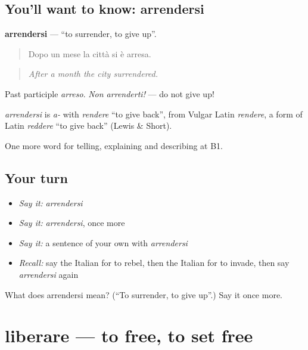 \subsection*{You'll want to know: arrendersi}
\textbf{arrendersi} — \textquotedblleft{}to surrender, to give up\textquotedblright{}.

\begin{quote}
Dopo un mese la città si è arresa.
\end{quote}

\begin{quote}
\emph{After a month the city surrendered.}
\end{quote}

Past participle \emph{arreso}. \emph{Non arrenderti!} — do not give up!

\begin{cousinweb}
\emph{arrendersi} is \emph{a-} with \emph{rendere} \textquotedblleft{}to give back\textquotedblright{}, from Vulgar Latin \emph{rendere}, a form of Latin \emph{reddere} \textquotedblleft{}to give back\textquotedblright{} (Lewis \& Short).
\end{cousinweb}

\begin{grammarlens}[title={What you've built}]
One more word for telling, explaining and describing at B1.
\end{grammarlens}

\subsection*{Your turn}
\begin{itemize}
\raggedright
  \item \emph{Say it:} \emph{arrendersi}
  \item \emph{Say it:} \emph{arrendersi}, once more
  \item \emph{Say it:} a sentence of your own with \emph{arrendersi}
  \item \emph{Recall:} say the Italian for to rebel, then the Italian for to invade, then say \emph{arrendersi} again
\end{itemize}

\begin{tcolorbox}[breakable,colback=teal!4,colframe=teal!35!black,title={Before you move on}]
What does arrendersi mean? (\textquotedblleft{}To surrender, to give up\textquotedblright{}.) Say it once more.
\end{tcolorbox}
\section[liberare]{liberare — to free, to set free}

